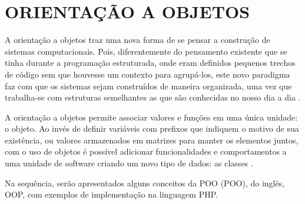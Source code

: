 \section{ORIENTAÇÃO A OBJETOS}

A orientação a objetos traz uma nova forma de se pensar a construção de sistemas
computacionais. Pois, diferentemente do pensamento existente que se tinha
durante a programação estruturada, onde eram definidos pequenos trechos de 
código sem que houvesse um contexto para agrupá-los, este novo paradigma faz 
com que os sistemas sejam construídos de maneira organizada, uma vez que 
trabalha-se com estruturas semelhantes as que são conhecidas no nosso dia a dia
\cite{phpProgramandoComOrientacaoAObjetos}.

A orientação a objetos permite associar valores e funções em uma única
unidade: o objeto. Ao invés de definir variáveis com prefixos que indiquem o 
motivo de sua existência, ou valores armazenados em matrizes para manter os 
elementos juntos, com o uso de objetos é possível adicionar funcionalidades e 
comportamentos a uma unidade de software criando um novo tipo de dados: as 
classes \cite{phpMasterWriteCuttingEdgeCode}.

Na sequência, serão apresentados alguns conceitos da \acl{POO} (\acs{POO}), do
inglês, \ac{OOP}, com exemplos de implementação na linguagem \acs{PHP}.













